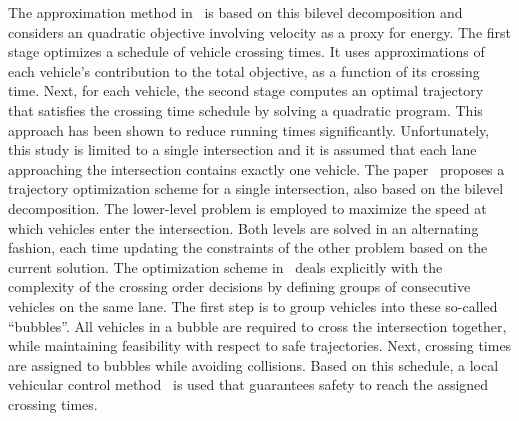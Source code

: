 \documentclass{article}
\theoremstyle{definition}
\theoremstyle{plain}
\begin{document}
The approximation method in~\cite{hultApproximateSolutionOptimal2015} is based
on this bilevel decomposition and considers an quadratic objective involving
velocity as a proxy for energy. The first stage optimizes a schedule of vehicle
crossing times. It uses approximations of each vehicle's contribution to the
total objective, as a function of its crossing time. Next, for each vehicle, the
second stage computes an optimal trajectory that satisfies the crossing time
schedule by solving a quadratic program. This approach has been shown to reduce
running times significantly. Unfortunately, this study is limited to a single
intersection and it is assumed that each lane approaching the intersection
contains exactly one vehicle.
The paper~\cite{zhaoBilevelProgrammingModel2021} proposes a trajectory
optimization scheme for a single intersection, also based on the bilevel
decomposition. The lower-level problem is employed to maximize the speed at
which vehicles enter the intersection. Both levels are solved in an alternating
fashion, each time updating the constraints of the other problem based on the
current solution.
The optimization scheme
in~\cite{tallapragadaHierarchicaldistributedOptimizedCoordination2017} deals
explicitly with the complexity of the crossing order decisions by defining
groups of consecutive vehicles on the same lane. The first step is to group
vehicles into these so-called ``bubbles''. All vehicles in a bubble are required
to cross the intersection together, while maintaining feasibility with respect
to safe trajectories. Next, crossing times are assigned to bubbles while
avoiding collisions. Based on this schedule, a local vehicular control
method~\cite{tallapragadaDistributedControlVehicle2017} is used that guarantees
safety to reach the assigned crossing times.



\end{document}
